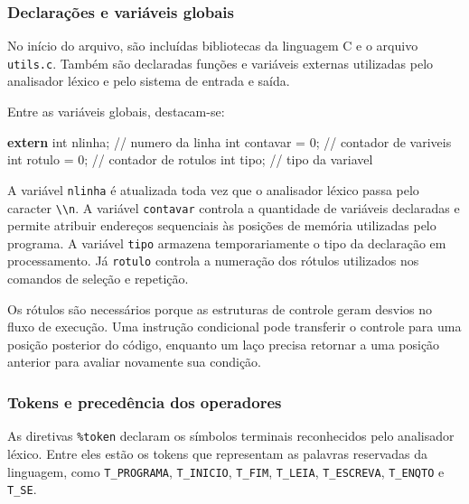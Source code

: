 \documentclass[
  brazilian,
  letterpaper,
]{book}
\newenvironment{Shaded}{\begin{snugshade}}{\end{snugshade}}
\newcommand{\CommentTok}[1]{\textcolor[rgb]{0.37,0.37,0.37}{#1}}
\newcommand{\DataTypeTok}[1]{\textcolor[rgb]{0.68,0.00,0.00}{#1}}
\newcommand{\DecValTok}[1]{\textcolor[rgb]{0.68,0.00,0.00}{#1}}
\newcommand{\KeywordTok}[1]{\textcolor[rgb]{0.00,0.23,0.31}{\textbf{#1}}}
\newcommand{\NormalTok}[1]{\textcolor[rgb]{0.00,0.23,0.31}{#1}}
\newcommand{\OperatorTok}[1]{\textcolor[rgb]{0.37,0.37,0.37}{#1}}
\theoremstyle{plain}
\theoremstyle{definition}
\theoremstyle{remark}
\begin{document}
\subsubsection{Declarações e variáveis
globais}\label{declarauxe7uxf5es-e-variuxe1veis-globais}

No início do arquivo, são incluídas bibliotecas da linguagem C e o
arquivo \texttt{utils.c}. Também são declaradas funções e variáveis
externas utilizadas pelo analisador léxico e pelo sistema de entrada e
saída.

Entre as variáveis globais, destacam-se:

\begin{Shaded}
\begin{Highlighting}[]
\KeywordTok{extern} \DataTypeTok{int}\NormalTok{ nlinha}\OperatorTok{;}   \CommentTok{// numero da linha}
\DataTypeTok{int}\NormalTok{ contavar }\OperatorTok{=} \DecValTok{0}\OperatorTok{;}    \CommentTok{// contador de variveis}
\DataTypeTok{int}\NormalTok{ rotulo }\OperatorTok{=} \DecValTok{0}\OperatorTok{;}      \CommentTok{// contador de rotulos}
\DataTypeTok{int}\NormalTok{ tipo}\OperatorTok{;}            \CommentTok{// tipo da variavel}
\end{Highlighting}
\end{Shaded}

A variável \texttt{nlinha} é atualizada toda vez que o analisador léxico
passa pelo caracter \texttt{\textbackslash{}\textbackslash{}n}. A
variável \texttt{contavar} controla a quantidade de variáveis declaradas
e permite atribuir endereços sequenciais às posições de memória
utilizadas pelo programa. A variável \texttt{tipo} armazena
temporariamente o tipo da declaração em processamento. Já
\texttt{rotulo} controla a numeração dos rótulos utilizados nos comandos
de seleção e repetição.

Os rótulos são necessários porque as estruturas de controle geram
desvios no fluxo de execução. Uma instrução condicional pode transferir
o controle para uma posição posterior do código, enquanto um laço
precisa retornar a uma posição anterior para avaliar novamente sua
condição.

\subsubsection{Tokens e precedência dos
operadores}\label{tokens-e-preceduxeancia-dos-operadores}

As diretivas \texttt{\%token} declaram os símbolos terminais
reconhecidos pelo analisador léxico. Entre eles estão os tokens que
representam as palavras reservadas da linguagem, como
\texttt{T\_PROGRAMA}, \texttt{T\_INICIO}, \texttt{T\_FIM},
\texttt{T\_LEIA}, \texttt{T\_ESCREVA}, \texttt{T\_ENQTO} e
\texttt{T\_SE}.
\end{document}
